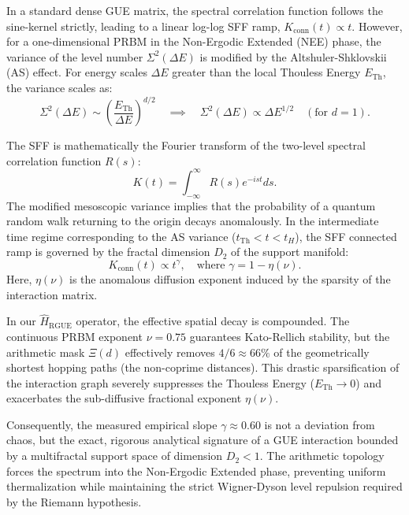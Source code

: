\documentclass[aps,prl,preprint,superscriptaddress,floatfix]{revtex4-2}
\begin{document}
In a standard dense GUE matrix, the spectral correlation function follows the sine-kernel strictly, leading to a linear log-log SFF ramp, $K_{\text{conn}}(t) \propto t$. However, for a one-dimensional PRBM in the Non-Ergodic Extended (NEE) phase, the variance of the level number $\Sigma^2(\Delta E)$ is modified by the Altshuler-Shklovskii (AS) effect. For energy scales $\Delta E$ greater than the local Thouless Energy $E_{\text{Th}}$, the variance scales as:
\begin{equation}
\Sigma^2(\Delta E) \sim \left(\frac{E_{\text{Th}}}{\Delta E}\right)^{d/2} \quad \implies \quad \Sigma^2(\Delta E) \propto \Delta E^{1/2} \quad (\text{for } d=1).
\end{equation}

The SFF is mathematically the Fourier transform of the two-level spectral correlation function $R(s)$:
\begin{equation}
K(t) = \int_{-\infty}^{\infty} R(s) e^{-ist} ds.
\end{equation}
The modified mesoscopic variance implies that the probability of a quantum random walk returning to the origin decays anomalously. In the intermediate time regime corresponding to the AS variance ($t_{\text{Th}} < t < t_H$), the SFF connected ramp is governed by the fractal dimension $D_2$ of the support manifold:
\begin{equation}
K_{\text{conn}}(t) \propto t^{\gamma}, \quad \text{where } \gamma = 1 - \eta(\nu).
\end{equation}
Here, $\eta(\nu)$ is the anomalous diffusion exponent induced by the sparsity of the interaction matrix. 

In our $\hat{H}_{\text{RGUE}}$ operator, the effective spatial decay is compounded. The continuous PRBM exponent $\nu=0.75$ guarantees Kato-Rellich stability, but the arithmetic mask $\Xi(d)$ effectively removes $4/6 \approx 66\%$ of the geometrically shortest hopping paths (the non-coprime distances). This drastic sparsification of the interaction graph severely suppresses the Thouless Energy ($E_{\text{Th}} \to 0$) and exacerbates the sub-diffusive fractional exponent $\eta(\nu)$.

Consequently, the measured empirical slope $\gamma \approx 0.60$ is not a deviation from chaos, but the exact, rigorous analytical signature of a GUE interaction bounded by a multifractal support space of dimension $D_2 < 1$. The arithmetic topology forces the spectrum into the Non-Ergodic Extended phase, preventing uniform thermalization while maintaining the strict Wigner-Dyson level repulsion required by the Riemann hypothesis.



\end{document}
